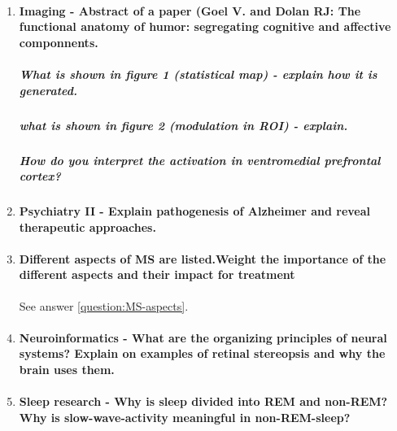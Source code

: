 \documentclass[12pt,article,oneside,a4paper]{memoir}
\begin{document}
\begin{enumerate}
\item \paragraph{Imaging - Abstract of a paper (Goel V. and Dolan RJ: The functional anatomy of humor: segregating cognitive and affective componnents.}
\subparagraph{What is shown in figure 1 (statistical map) - explain how it is generated.}
\subparagraph{what is shown in figure 2 (modulation in ROI) - explain.}
\subparagraph{How do you interpret the activation in ventromedial prefrontal cortex?}
\item \paragraph{Psychiatry II - Explain pathogenesis of Alzheimer and reveal therapeutic approaches.}
\item \paragraph{Different aspects of MS are listed.Weight the importance of the different aspects and their impact for treatment} See answer \ref{question:MS-aspects}.
\item \paragraph{Neuroinformatics - What are the organizing principles of neural systems? Explain on examples of retinal stereopsis and why the brain uses them.}
\item \paragraph{Sleep research - Why is sleep divided into REM and non-REM? Why is slow-wave-activity meaningful in non-REM-sleep?}
\end{enumerate}
\end{document}
